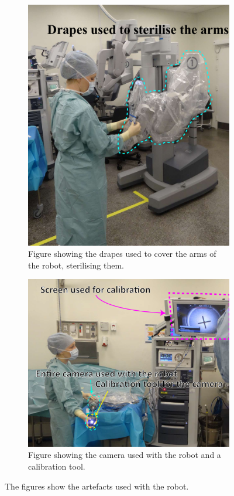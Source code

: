 \documentclass[paper=a4, fontsize=11pt]{scrartcl} %
\numberwithin{equation}{section} %
\numberwithin{figure}{section} %
\numberwithin{table}{section} %
\begin{document}
\begin{figure}[hbpt]
	\centering
	\begin{subfigure}[b]{0.4\textwidth}
		\includegraphics[width=\textwidth]{drapes}
		\caption{Figure showing the drapes used to cover the arms of the robot, sterilising them.}
		\label{fig:drapes}
	\end{subfigure}
	\begin{subfigure}[b]{0.4\textwidth}
		\includegraphics[width=\textwidth]{camera}
		\caption{Figure showing the camera used with the robot and a calibration tool.}
		\label{fig:camera}
	\end{subfigure}
	\caption{The figures show the artefacts used with the robot.}
	\label{fig:artefacts}
\end{figure}
\end{document}
